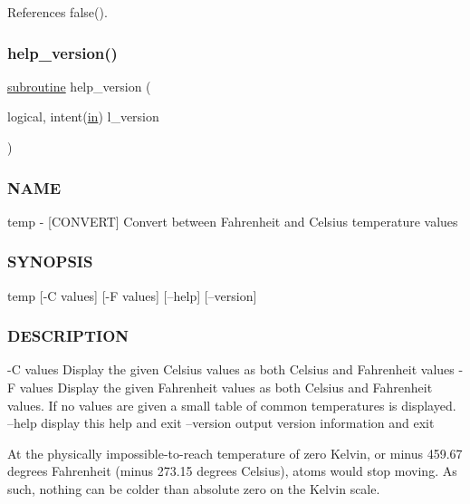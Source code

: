 References false().

\mbox{\label{temp_8f90_a39c21619b08a3c22f19e2306efd7f766}} 
\subsubsection{\texorpdfstring{help\+\_\+version()}{help\_version()}}
{\footnotesize\ttfamily \hyperlink{M__stopwatch_83_8txt_acfbcff50169d691ff02d4a123ed70482}{subroutine} help\+\_\+version (\begin{DoxyParamCaption}\item[{logical, intent(\hyperlink{M__journal_83_8txt_afce72651d1eed785a2132bee863b2f38}{in})}]{l\+\_\+version }\end{DoxyParamCaption})}



\subsubsection*{N\+A\+ME}

temp -\/ \mbox{[}C\+O\+N\+V\+E\+RT\mbox{]} Convert between Fahrenheit and Celsius temperature values 

\subsubsection*{S\+Y\+N\+O\+P\+S\+IS}

\begin{DoxyVerb}temp [-C values] [-F values] [--help] [--version]
\end{DoxyVerb}


\subsubsection*{D\+E\+S\+C\+R\+I\+P\+T\+I\+ON}

\begin{DoxyVerb}-C values  Display the given Celsius values as both Celsius and
           Fahrenheit values
-F values  Display the given Fahrenheit values as both Celsius and
           Fahrenheit values. If no values are given a small table of
           common temperatures is displayed.
--help     display this help and exit
--version  output version information and exit

At the physically impossible-to-reach temperature of zero Kelvin,
or minus 459.67 degrees Fahrenheit (minus 273.15 degrees Celsius),
atoms would stop moving. As such, nothing can be colder than absolute
zero on the Kelvin scale.
\end{DoxyVerb}


